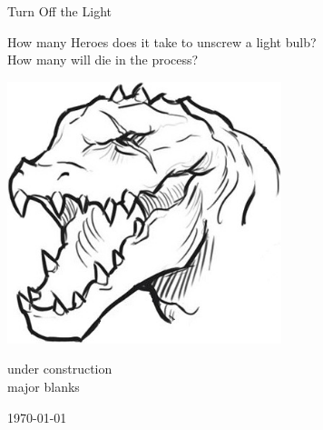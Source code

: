 














\thispagestyle{empty}

\null          %
\vspace{1cm}   %

\begin{center}

\huge
Turn Off the Light

\vspace{0.3\baselineskip}

\large
How many Heroes does it take to unscrew a light bulb?\\
How many will die in the process?

\vspace{2cm}

\includegraphics[width=80mm]{./fig/lizardman-head.jpg}

\vspace{2 cm}


\normalsize
under construction\\
major blanks

\vfill

\today

\end{center}






